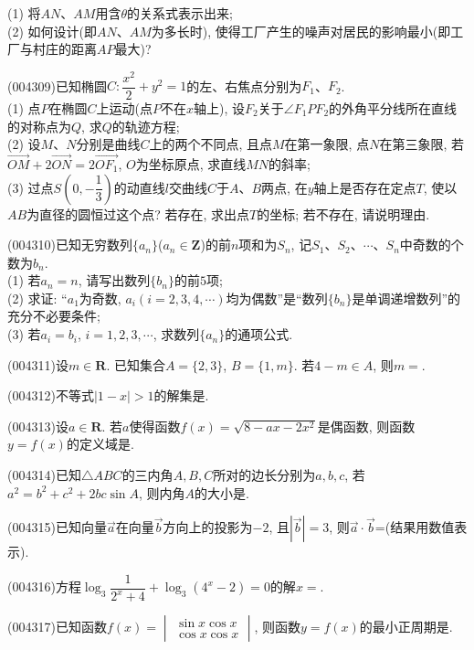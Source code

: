 (1) 将$AN$、$AM$用含$\theta$的关系式表示出来;\\
(2) 如何设计(即$AN$、$AM$为多长时), 使得工厂产生的噪声对居民的影响最小(即工厂与村庄的距离$AP$最大)?
\item (004309)已知椭圆$C:\dfrac{x^2}2+y^2=1$的左、右焦点分别为$F_1$、$F_2$.\\
(1) 点$P$在椭圆$C$上运动(点$P$不在$x$轴上), 设$F_2$关于$\angle F_1PF_2$的外角平分线所在直线的对称点为$Q$, 求$Q$的轨迹方程;\\
(2) 设$M$、$N$分别是曲线$C$上的两个不同点, 且点$M$在第一象限, 点$N$在第三象限, 若$\overrightarrow{OM}+2\overrightarrow{ON}=2\overrightarrow{OF_1}$, $O$为坐标原点, 求直线$MN$的斜率;\\
(3) 过点$S(0,-\dfrac 13)$的动直线$l$交曲线$C$于$A$、$B$两点, 在$y$轴上是否存在定点$T$, 使以$AB$为直径的圆恒过这个点? 若存在, 求出点$T$的坐标; 若不存在, 请说明理由.
\item (004310)已知无穷数列$\{a_n\}$($a_n\in \mathbf{Z}$)的前$n$项和为$S_n$, 记$S_1$、$S_2$、$\cdots$、$S_n$中奇数的个数为$b_n$.\\
(1) 若$a_n=n$, 请写出数列$\{b_n\}$的前$5$项;\\
(2) 求证: ``$a_1$为奇数, $a_i(i=2,3,4,\cdots)$均为偶数''是``数列$\{b_n\}$是单调递增数列''的充分不必要条件;\\
(3) 若$a_i=b_i$, $i=1,2,3,\cdots$, 求数列$\{a_n\}$的通项公式.
\item (004311)设$m\in \mathbf{R}$. 已知集合$A=\{2,3\}$, $B=\{1,m\}$. 若$4-m\in A$, 则$m=$.
\item (004312)不等式$|1-x|>1$的解集是.
\item (004313)设$a\in \mathbf{R}$. 若$a$使得函数$f(x)=\sqrt{8-ax-2x^2}$是偶函数, 则函数$y=f(x)$的定义域是.
\item (004314)已知$\triangle ABC$的三内角$A,B,C$所对的边长分别为$a,b,c$, 若$a^2=b^2+c^2+2bc\sin A$, 则内角$A$的大小是.
\item (004315)已知向量$\overrightarrow a$在向量$\overrightarrow b$方向上的投影为$-2$, 且$|\overrightarrow b|=3$, 则$\overrightarrow a\cdot \overrightarrow b$=(结果用数值表示).
\item (004316)方程$\log_3\dfrac 1{2^x+4}+\log_3(4^x-2)=0$的解$x=$.
\item (004317)已知函数$f(x)=\begin{vmatrix} \sin x  \cos x  \\ \cos x  \cos x  \end{vmatrix}$, 则函数$y=f(x)$的最小正周期是.
